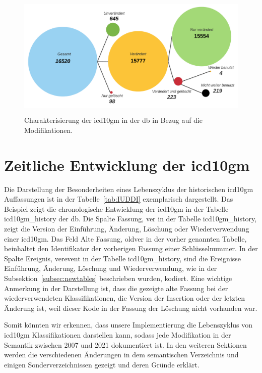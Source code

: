  \begin{figure}[ht]
 	\centering
 	\includegraphics[height=6cm]{figures/icd10gm_quantities}
 	\caption[\acs{icd10gm} in der \acs{db}]{Charakterisierung der \acs{icd10gm} in der \ac{db} in Bezug auf die Modifikationen.}
 	\label{fig:icddb}
 \end{figure}

\section{Zeitliche Entwicklung der \acs{icd10gm}} \label{sec:timeicd}

Die Darstellung der Besonderheiten eines Lebenszyklus der historischen \ac{icd10gm} Auffassungen ist in der Tabelle~\ref{tab:IUDDI} exemplarisch dargestellt. Das Beispiel zeigt die chronologische Entwicklung der \ac{icd10gm} in der Tabelle \glqq\textsf{icd10gm\_history}\grqq{} der \ac{db}. Die Spalte Fassung, \glqq\textsf{ver}\grqq{} in der Tabelle \glqq\textsf{icd10gm\_history}\grqq{}, zeigt die Version der Einführung, Änderung, Löschung oder Wiederverwendung einer \ac{icd10gm}. Das Feld Alte Fassung, \glqq\textsf{oldver}\grqq{} in der vorher genannten Tabelle, beinhaltet den Identifikator der vorherigen Fassung einer Schlüsselnummer. In der Spalte Ereignis, \glqq\textsf{verevent}\grqq{} in der Tabelle \glqq\textsf{icd10gm\_history}\grqq{}, sind die Ereignisse Einführung, Änderung, Löschung und Wiederverwendung, wie in der Subsektion~\ref{subsec:newtables} beschrieben wurden, kodiert. Eine wichtige Anmerkung in der Darstellung ist, dass die gezeigte alte Fassung bei der wiederverwendeten Klassifikationen, die Version der Insertion oder der letzten Änderung ist, weil dieser Kode in der Fassung der Löschung nicht vorhanden war.

Somit könnten wir erkennen, dass unsere Implementierung die Lebenszyklus von \ac{icd10gm} Klassifikationen darstellen kann, sodass jede Modifikation in der Semantik zwischen 2007 und 2021 dokumentiert ist. In den weiteren Sektionen werden die verschiedenen Änderungen in dem semantischen Verzeichnis und einigen Sonderverzeichnissen gezeigt und deren Gründe erklärt.

